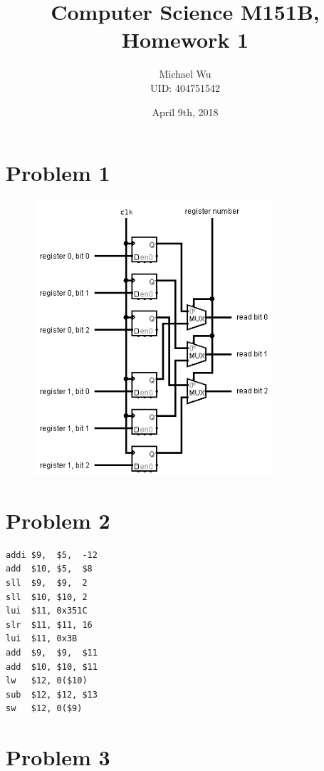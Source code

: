 \documentclass[12pt]{article}
\begin{document}
\title{Computer Science M151B, Homework 1}
\date{April 9th, 2018}
\author{Michael Wu\\UID: 404751542}
\maketitle

\section*{Problem 1}

\begin{figure}[ht]
    \begin{center}
        \includegraphics[width=3.5in]{problem1.png}
    \end{center}
\end{figure}

\section*{Problem 2}

\begin{verbatim}
addi $9,  $5,  -12
add  $10, $5,  $8
sll  $9,  $9,  2
sll  $10, $10, 2
lui  $11, 0x351C
slr  $11, $11, 16
lui  $11, 0x3B
add  $9,  $9,  $11
add  $10, $10, $11
lw   $12, 0($10)
sub  $12, $12, $13
sw   $12, 0($9)
\end{verbatim}

\section*{Problem 3}
\end{document}

